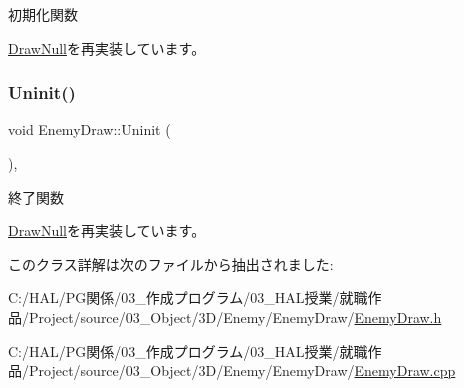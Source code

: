 初期化関数 



\mbox{\hyperlink{class_draw_null_acd7fef3ccea1da537ac9507ffbb6dd2e}{Draw\+Null}}を再実装しています。

\mbox{\label{class_enemy_draw_a2861dc0623b0be7726bc69a6a469190e}} 
\subsubsection{\texorpdfstring{Uninit()}{Uninit()}}
{\footnotesize\ttfamily void Enemy\+Draw\+::\+Uninit (\begin{DoxyParamCaption}{ }\end{DoxyParamCaption})\hspace{0.3cm}{\ttfamily [override]}, {\ttfamily [virtual]}}



終了関数 



\mbox{\hyperlink{class_draw_null_a12d44e341c7364b5ab9cdd661dc16187}{Draw\+Null}}を再実装しています。



このクラス詳解は次のファイルから抽出されました\+:\begin{DoxyCompactItemize}
\item 
C\+:/\+H\+A\+L/\+P\+G関係/03\+\_\+作成プログラム/03\+\_\+\+H\+A\+L授業/就職作品/\+Project/source/03\+\_\+\+Object/3\+D/\+Enemy/\+Enemy\+Draw/\mbox{\hyperlink{_enemy_draw_8h}{Enemy\+Draw.\+h}}\item 
C\+:/\+H\+A\+L/\+P\+G関係/03\+\_\+作成プログラム/03\+\_\+\+H\+A\+L授業/就職作品/\+Project/source/03\+\_\+\+Object/3\+D/\+Enemy/\+Enemy\+Draw/\mbox{\hyperlink{_enemy_draw_8cpp}{Enemy\+Draw.\+cpp}}\end{DoxyCompactItemize}
